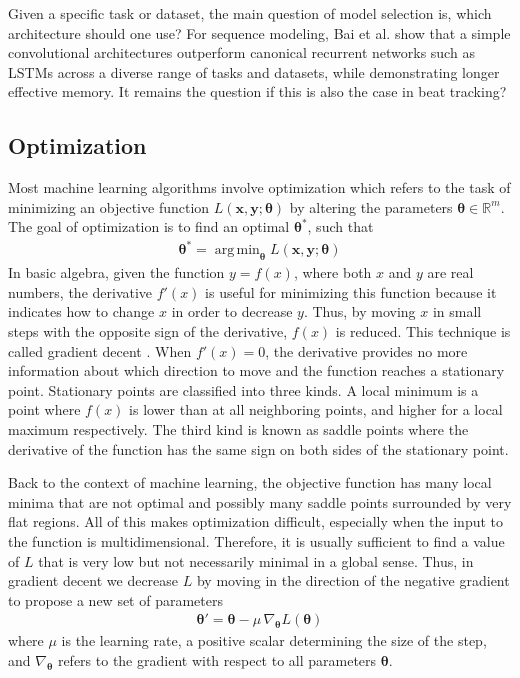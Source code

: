 \documentclass{scrartcl}
\DeclareMathOperator*{\argmin}{arg\,min}
\begin{document}
Given a specific task or dataset, the main question of model selection is, which architecture should one use? For sequence modeling, Bai et al. \cite{Bai2018} show that a simple convolutional architectures outperform canonical recurrent networks such as LSTMs across a diverse range of tasks and datasets, while demonstrating longer effective memory. It remains the question if this is also the case in beat tracking?



\subsection{Optimization}

Most machine learning algorithms involve optimization which refers to the task of minimizing an objective function $L(\mathbf x, \mathbf y; \boldsymbol \theta)$ by altering the parameters $\boldsymbol \theta \in \mathbb R^m$. The goal of optimization is to find an optimal $\boldsymbol \theta^*$, such that
\begin{align}
\boldsymbol \theta^* = \argmin_{\boldsymbol \theta} L(\mathbf x, \mathbf y; \boldsymbol \theta)
\end{align} 
In basic algebra, given the function $y=f(x)$, where both $x$ and $y$ are real numbers, the derivative $f'(x)$ is useful for minimizing this function because it indicates how to change $x$ in order to decrease $y$. Thus, by moving $x$ in small steps with the opposite sign of the derivative, $f(x)$ is reduced. This technique is called gradient decent \cite{Cauchy1847}. When $f'(x)=0$, the derivative provides no more information about which direction to move and the function reaches a stationary point. Stationary points are classified into three kinds. A local minimum is a point where $f(x)$ is lower than at all neighboring points, and higher for a local maximum respectively. The third kind is known as saddle points where the derivative of the function has the same sign on both sides of the stationary point.  

Back to the context of machine learning, the objective function has many local minima that are not optimal and possibly many saddle points surrounded by very flat regions. All of this makes optimization difficult, especially when the input to the function is multidimensional. Therefore, it is usually sufficient to find a value of $L$ that is very low but not necessarily minimal in a global sense. Thus, in gradient decent we decrease $L$ by moving in the direction of the negative gradient to propose a new set of parameters
\begin{align}
\boldsymbol \theta' = \boldsymbol \theta - \mu \,\nabla_{\boldsymbol \theta}L(\boldsymbol \theta)
\end{align} 
where $\mu$ is the learning rate, a positive scalar determining the size of the step, and $\nabla_{\boldsymbol \theta}$ refers to the gradient with respect to all parameters $\boldsymbol \theta$.
\end{document}
